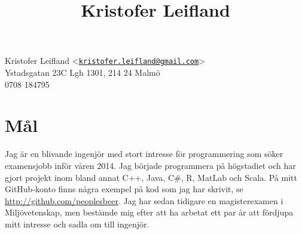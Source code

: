 \documentclass[10pt]{article}
\title{Kristofer Leifland}
\author{}
\date{}
\begin{document}
\maketitle
\thispagestyle{empty}
\pagestyle{empty}
\noindent
Kristofer Leifland <\href{mailto:kristofer.leifland@gmail.com}{\nolinkurl{kristofer.leifland@gmail.com}}>\\
Ystadsgatan 23C Lgh 1301, 214 24 Malmö\\
0708 184795\\

\section*{Mål}
Jag är en blivande ingenjör med stort intresse för programmering som söker examensjobb inför våren 2014. Jag började programmera på högstadiet och har gjort projekt inom bland annat C++, Java, C\#, R, MatLab och Scala. På mitt GitHub-konto finns några exempel på kod som jag har skrivit, se \url{http://github.com/peoplesbeer}. Jag har sedan tidigare en magisterexamen i Miljövetenskap, men bestämde mig efter att ha arbetat ett par år att fördjupa mitt intresse och sadla om till ingenjör.
\end{document}

